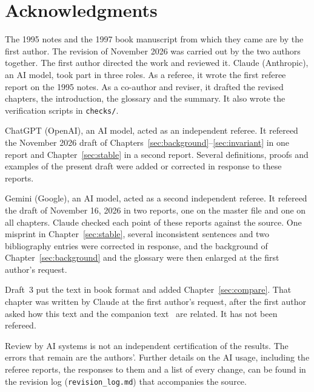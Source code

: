 \documentclass[12pt,letterpaper,openany]{book}
\numberwithin{equation}{chapter}
\theoremstyle{plain}
\theoremstyle{definition}
\theoremstyle{remark}
\theoremstyle{plain}
\begin{document}
\tableofcontents














\chapter*{Acknowledgments}

The 1995 notes and the 1997 book manuscript from which they came are by
the first author. The revision of November 2026 was carried out by the
two authors together. The first author directed the work and reviewed
it. Claude (Anthropic), an AI model, took part in three roles. As a
referee, it wrote the first referee report on the 1995 notes. As a
co-author and reviser, it drafted the revised chapters, the
introduction, the glossary and the summary. It also wrote the
verification scripts in \texttt{checks/}.

ChatGPT (OpenAI), an AI model, acted as an independent referee. It
refereed the November 2026 draft of
Chapters~\ref{sec:background}--\ref{sec:invariant} in one report and
Chapter~\ref{sec:stable} in a second report. Several definitions, proofs
and examples of the present draft were added or corrected in response
to these reports.

Gemini (Google), an AI model, acted as a second independent referee. It
refereed the draft of November 16, 2026 in two reports, one on the master
file and one on all chapters. Claude checked each point of these reports
against the source. One misprint in Chapter~\ref{sec:stable}, several
inconsistent sentences and two bibliography entries were corrected in
response, and the background of Chapter~\ref{sec:background} and the
glossary were then enlarged at the first author's request.

Draft~3 put the text in book format and added
Chapter~\ref{sec:compare}. That chapter was written by Claude at the
first author's request, after the first author asked how this text and
the companion text~\cite{JC26} are related. It has not been refereed.

Review by AI systems is not an independent certification of the
results. The errors that remain are the authors'. Further details on the
AI usage, including the referee reports, the responses to them and a
list of every change, can be found in the revision log
(\texttt{revision\_log.md}) that accompanies the source.
\end{document}
